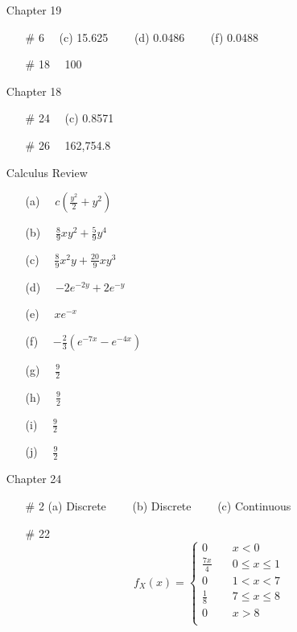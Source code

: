 \documentclass[12pt]{article}
\begin{document}
\begin{itemize}
\item[] Chapter 19           \label{ANS_19}
	\begin{itemize}
	\item[\# 6]   \ \  (c) 15.625  \ \ \ \ (d) 0.0486 \ \ \ \  (f)  0.0488

	\item[\# 18]   \ \  100
	\end{itemize}

\item[] Chapter 18           \label{ANS_18}
	\begin{itemize}
	\item[\# 24]   \ \  (c) 0.8571
	\item[\# 26]   \ \  162,754.8
	\end{itemize}


\item[] Calculus Review           \label{ANS_CALC}
	\begin{itemize}
	\item[(a)] \ \  $c(\frac{y^{2}}{2}+y^{2})$
	\item[(b)] \ \  $ \frac{8}{9}xy^{2}+\frac{5}{9}y^{4}  $
	\item[(c)] \ \  $ \frac{8}{9}x^{2}y+\frac{20}{9}xy^{3}  $ 
	\item[(d)] \ \   $ -2e^{-2y}+2e^{-y}  $
	\item[(e)] \ \   $  xe^{-x} $
	\item[(f)] \ \   $-\frac{2}{3}(e^{-7x}-e^{-4x})$
	\item[(g)] \ \   $  \frac{9}{2} $
	\item[(h)] \ \   $ \frac{9}{2}  $
	\item[(i)]  \ \   $ \frac{9}{2}  $
	\item[(j)] \ \   $  \frac{9}{2} $
	\end{itemize}
	
	
	
\item[] Chapter 24           \label{ANS_24}
	\begin{itemize}
	\item[\# 2] (a)  Discrete \ \ \ \ (b) Discrete \ \ \ \   (c)  Continuous
	\item[\# 22] 
	$$
f_X(x) = \left\{
        \begin{array}{ll}
            0 & \quad x <0 \\
            \frac{7x}{4} & \quad 0\leq x\leq 1 \\
            0 & \quad 1< x< 7 \\
            \frac{1}{8} & \quad 7\leq x\leq 8 \\
            0 & \quad  x>8 \\
        \end{array}
    \right.
$$


\end{itemize}
\end{itemize}
\end{document}
